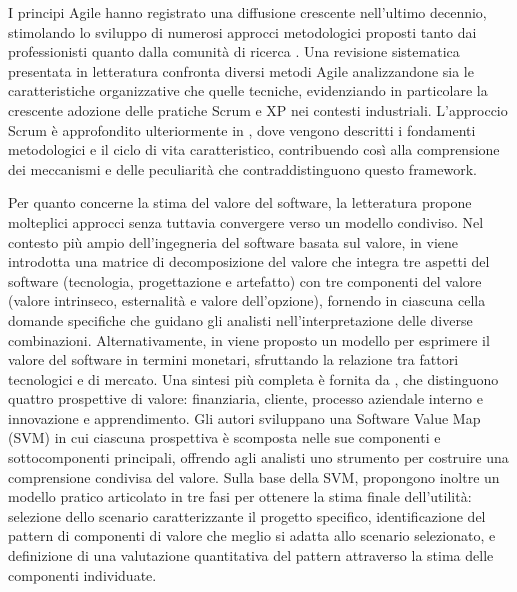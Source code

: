 \documentclass[12pt,a4paper,openright,twoside]{book}
\begin{document}
I principi Agile hanno registrato una diffusione crescente nell'ultimo decennio, stimolando lo sviluppo di numerosi approcci metodologici proposti tanto dai professionisti quanto dalla comunità di ricerca \cite{1201204}. Una revisione sistematica presentata in letteratura \cite{DYBA2008833} confronta diversi metodi Agile analizzandone sia le caratteristiche organizzative che quelle tecniche, evidenziando in particolare la crescente adozione delle pratiche Scrum e XP nei contesti industriali. L'approccio Scrum è approfondito ulteriormente in \cite{10.1007/978-1-4471-0947-1_11}, dove vengono descritti i fondamenti metodologici e il ciclo di vita caratteristico, contribuendo così alla comprensione dei meccanismi e delle peculiarità che contraddistinguono questo framework.

\vspace{1em}

Per quanto concerne la stima del valore del software, la letteratura propone molteplici approcci senza tuttavia convergere verso un modello condiviso. Nel contesto più ampio dell'ingegneria del software basata sul valore, in \cite{ronkko2009integrating} viene introdotta una matrice di decomposizione del valore che integra tre aspetti del software (tecnologia, progettazione e artefatto) con tre componenti del valore (valore intrinseco, esternalità e valore dell'opzione), fornendo in ciascuna cella domande specifiche che guidano gli analisti nell'interpretazione delle diverse combinazioni. Alternativamente, in \cite{park2004new} viene proposto un modello per esprimere il valore del software in termini monetari, sfruttando la relazione tra fattori tecnologici e di mercato. Una sintesi più completa è fornita da \cite{khurum2013software}, che distinguono quattro prospettive di valore: finanziaria, cliente, processo aziendale interno e innovazione e apprendimento. Gli autori sviluppano una Software Value Map (SVM) in cui ciascuna prospettiva è scomposta nelle sue componenti e sottocomponenti principali, offrendo agli analisti uno strumento per costruire una comprensione condivisa del valore. Sulla base della SVM, propongono inoltre un modello pratico articolato in tre fasi per ottenere la stima finale dell'utilità: selezione dello scenario caratterizzante il progetto specifico, identificazione del pattern di componenti di valore che meglio si adatta allo scenario selezionato, e definizione di una valutazione quantitativa del pattern attraverso la stima delle componenti individuate.

\vspace{1em}
\end{document}
